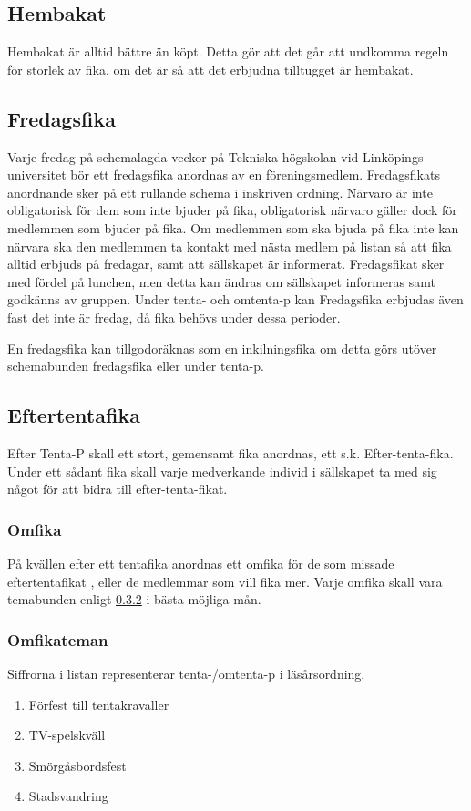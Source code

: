 \documentclass{article}
\begin{document}
\subsection{Hembakat} %
Hembakat är alltid bättre än köpt. Detta gör att det går att undkomma regeln för
storlek av fika, om det är så att det erbjudna tilltugget är hembakat.

\subsection{Fredagsfika} \label{fredagsfika} %
Varje fredag på schemalagda veckor på Tekniska högskolan vid Linköpings
universitet bör ett fredagsfika anordnas av en föreningsmedlem. Fredagsfikats
anordnande sker på ett rullande schema i inskriven ordning. Närvaro är inte
obligatorisk för dem som inte bjuder på fika, obligatorisk närvaro gäller dock
för medlemmen som bjuder på fika. Om medlemmen som ska bjuda på fika inte kan
närvara ska den medlemmen ta kontakt med nästa medlem på listan så att fika
alltid erbjuds på fredagar, samt att sällskapet är informerat. Fredagsfikat sker
med fördel på lunchen, men detta kan ändras om sällskapet informeras samt
godkänns av gruppen. Under tenta- och omtenta-p kan Fredagsfika erbjudas även
fast det inte är fredag, då fika behövs under dessa perioder.

En fredagsfika kan tillgodoräknas som en inkilningsfika om detta görs utöver
schemabunden fredagsfika eller under tenta-p.

\subsection{Eftertentafika} %
Efter Tenta-P skall ett stort, gemensamt fika anordnas, ett s.k.
Efter-tenta-fika. Under ett sådant fika skall varje medverkande individ i
sällskapet ta med sig något för att bidra till efter-tenta-fikat.

\subsubsection{Omfika}
På kvällen efter ett tentafika anordnas ett omfika för de som missade
eftertentafikat , eller de medlemmar som vill fika mer. Varje omfika skall vara
temabunden enligt \ref{omfikateman} i bästa möjliga mån.

\subsubsection{Omfikateman} \label{omfikateman}
Siffrorna i listan representerar tenta-/omtenta-p i läsårsordning.
\begin{enumerate}
  \item Förfest till tentakravaller
  \item TV-spelskväll
  \item Smörgåsbordsfest
  \item Stadsvandring
\end{enumerate}
\end{document}
